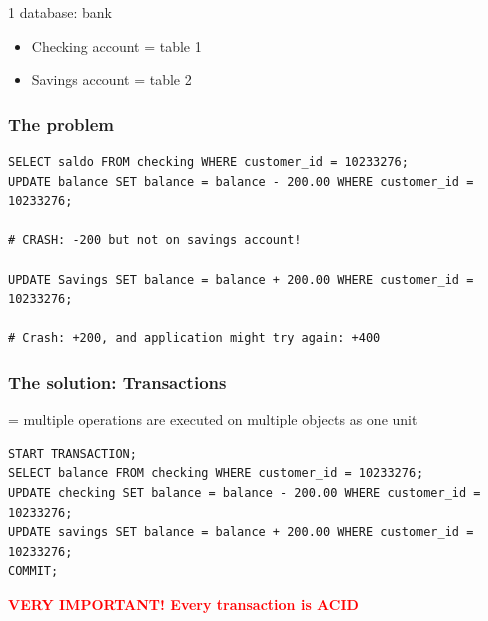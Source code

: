 \documentclass{article}
\begin{document}
1 database: bank

\begin{itemize}
    \item Checking account = table 1
    \item Savings account = table 2
\end{itemize}

\subsubsection{The problem}

\begin{verbatim}
SELECT saldo FROM checking WHERE customer_id = 10233276;
UPDATE balance SET balance = balance - 200.00 WHERE customer_id = 10233276;

# CRASH: -200 but not on savings account!
    
UPDATE Savings SET balance = balance + 200.00 WHERE customer_id = 10233276;

# Crash: +200, and application might try again: +400
\end{verbatim}

\subsubsection{The solution: Transactions}

= multiple operations are executed on multiple objects as one unit

\begin{verbatim}
START TRANSACTION;
SELECT balance FROM checking WHERE customer_id = 10233276;
UPDATE checking SET balance = balance - 200.00 WHERE customer_id = 10233276;
UPDATE savings SET balance = balance + 200.00 WHERE customer_id = 10233276;
COMMIT;
\end{verbatim}


\textcolor{red}{\textbf{VERY IMPORTANT! Every transaction is ACID}}
\end{document}
